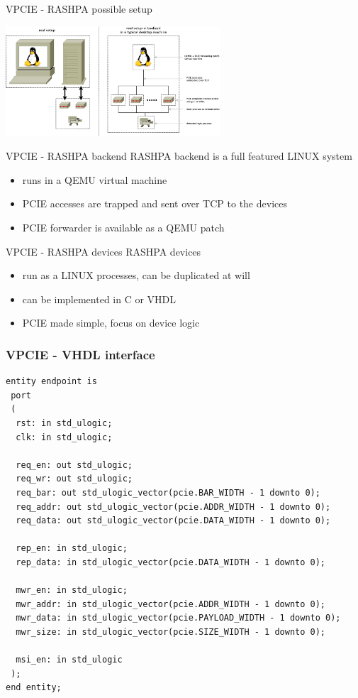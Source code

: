 \documentclass{beamer}
\begin{document}
\begin{frame}{VPCIE - RASHPA possible setup}
  \begin{center}
  \includegraphics[width=80mm]{pic/dv_vpcie/main.jpeg}
  \end{center}
\end{frame}

\begin{frame}{VPCIE - RASHPA backend}
  RASHPA backend is a full featured LINUX system
  \begin{itemize}
  \item runs in a QEMU virtual machine
  \item PCIE accesses are trapped and sent over TCP to the devices
  \item PCIE forwarder is available as a QEMU patch
  \end{itemize}
\end{frame}

\begin{frame}{VPCIE - RASHPA devices}
  RASHPA devices
  \begin{itemize}
  \item run as a LINUX processes, can be duplicated at will
  \item can be implemented in C or VHDL
  \item PCIE made simple, focus on device logic
  \end{itemize}
\end{frame}

\begin{frame}[containsverbatim]
 \frametitle{VPCIE - VHDL interface}
 \begin{tiny}
 \lstset{language=VHDL}
 \begin{lstlisting}[frame=tb]
entity endpoint is
 port
 (
  rst: in std_ulogic;
  clk: in std_ulogic;

  req_en: out std_ulogic;
  req_wr: out std_ulogic;
  req_bar: out std_ulogic_vector(pcie.BAR_WIDTH - 1 downto 0);
  req_addr: out std_ulogic_vector(pcie.ADDR_WIDTH - 1 downto 0);
  req_data: out std_ulogic_vector(pcie.DATA_WIDTH - 1 downto 0);

  rep_en: in std_ulogic;
  rep_data: in std_ulogic_vector(pcie.DATA_WIDTH - 1 downto 0);

  mwr_en: in std_ulogic;
  mwr_addr: in std_ulogic_vector(pcie.ADDR_WIDTH - 1 downto 0);
  mwr_data: in std_ulogic_vector(pcie.PAYLOAD_WIDTH - 1 downto 0);
  mwr_size: in std_ulogic_vector(pcie.SIZE_WIDTH - 1 downto 0);

  msi_en: in std_ulogic
 );
end entity;
 \end{lstlisting}
 \end{tiny}
\end{frame}
\end{document}
